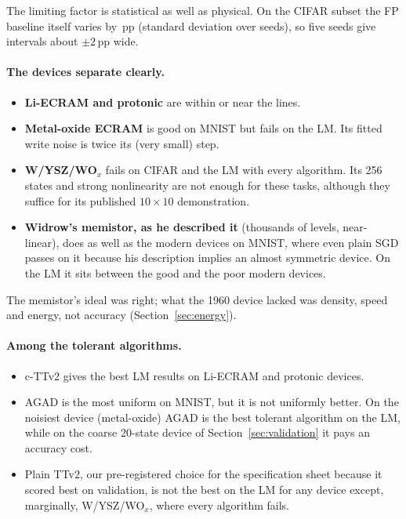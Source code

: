 The limiting factor is statistical as well as physical. On the CIFAR subset the FP baseline itself varies by
\REThreeCifarFpSd\,pp (standard deviation over seeds), so five seeds give intervals about $\pm2$\,pp wide.

\paragraph{The devices separate clearly.}
\begin{itemize}
\item \textbf{Li-ECRAM and protonic} are within or near the lines.
\item \textbf{Metal-oxide ECRAM} is good on MNIST but fails on the LM. Its fitted write noise is twice its (very small) step.
\item \textbf{W/YSZ/WO$_x$} fails on CIFAR and the LM with every algorithm. Its 256 states and strong nonlinearity are not
      enough for these tasks, although they suffice for its published $10\times10$ demonstration.
\item \textbf{Widrow's memistor, as he described it} (thousands of levels, near-linear), does as well as the modern devices on
      MNIST, where even plain SGD passes on it because his description implies an almost symmetric device. On the LM it sits between the good and the poor modern devices.
\end{itemize}
The memistor's ideal was right; what the 1960 device lacked was density, speed and energy, not accuracy
(Section~\ref{sec:energy}).

\paragraph{Among the tolerant algorithms.}
\begin{itemize}
\item c-TTv2 gives the best LM results on Li-ECRAM and protonic devices.
\item AGAD is the most uniform on MNIST, but it is not uniformly better. On the noisiest device (metal-oxide) AGAD is the best
      tolerant algorithm on the LM, while on the coarse 20-state device of Section~\ref{sec:validation} it pays an accuracy
      cost.
\item Plain TTv2, our pre-registered choice for the specification sheet because it scored best on validation, is not the best
      on the LM for any device except, marginally, W/YSZ/WO$_x$, where every algorithm fails.
\end{itemize}

